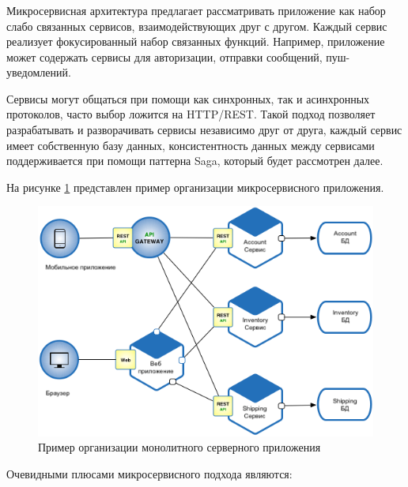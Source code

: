 \subsubsection {}
\label{sec:analysis:research:backArch:microservices}

Микросервисная архитектура предлагает рассматривать приложение как набор слабо связанных сервисов, взаимодействующих друг с другом. Каждый сервис реализует фокусированный набор связанных функций. Например, приложение может содержать сервисы для авторизации, отправки сообщений, пуш-уведомлений.

Сервисы могут общаться при помощи как синхронных, так и асинхронных протоколов, часто выбор ложится на HTTP/REST. Такой подход позволяет разрабатывать и разворачивать сервисы независимо друг от друга, каждый сервис имеет собственную базу данных, консистентность данных между сервисами поддерживается при помощи паттерна Saga, который будет рассмотрен далее. \cite{microservices:ms}

На рисунке \ref{sec:analysis:research:arch:back:micro} представлен пример организации микросервисного приложения.

\begin{figure}[h]
  \centering
    \includegraphics[width=1\textwidth]{inc/img/backend-micro.png}
  \caption{Пример организации монолитного серверного приложения}
  \label{sec:analysis:research:arch:back:micro}
\end{figure}

Очевидными плюсами микросервисного подхода являются:

